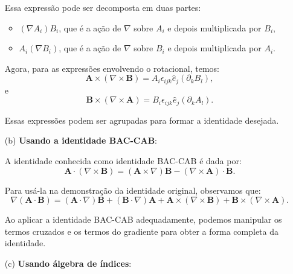 \documentclass[a4paper,12pt]{article}
\begin{document}
\begin{flushleft}
\begin{itemize}
        Essa expressão pode ser decomposta em duas partes:
        \begin{itemize}
            \item \( (\nabla A_i) B_i \), que é a ação de \( \nabla \) sobre \( A_i \) e depois multiplicada por \( B_i \),
            \item \( A_i (\nabla B_i) \), que é a ação de \( \nabla \) sobre \( B_i \) e depois multiplicada por \( A_i \).
        \end{itemize}
        
        Agora, para as expressões envolvendo o rotacional, temos:
        \begin{equation}
        \mathbf{A} \times (\nabla \times \mathbf{B}) = A_i \epsilon_{ijk} \hat{e}_j (\partial_k B_l),
        \end{equation}
        e
        \begin{equation}
        \mathbf{B} \times (\nabla \times \mathbf{A}) = B_i \epsilon_{ijk} \hat{e}_j (\partial_k A_l).
        \end{equation}
        
        Essas expressões podem ser agrupadas para formar a identidade desejada.
        
        \item[(b)] \textbf{Usando a identidade BAC-CAB}:
        
        A identidade conhecida como identidade BAC-CAB é dada por:
        \begin{equation}
        \mathbf{A} \cdot (\nabla \times \mathbf{B}) = (\mathbf{A} \times \nabla) \mathbf{B} - (\nabla \times \mathbf{A}) \cdot \mathbf{B}.
        \end{equation}
        
        Para usá-la na demonstração da identidade original, observamos que:
        \begin{equation}
        \nabla (\mathbf{A} \cdot \mathbf{B}) = (\mathbf{A} \cdot \nabla) \mathbf{B} + (\mathbf{B} \cdot \nabla) \mathbf{A} + \mathbf{A} \times (\nabla \times \mathbf{B}) + \mathbf{B} \times (\nabla \times \mathbf{A}).
        \end{equation}
        
        Ao aplicar a identidade BAC-CAB adequadamente, podemos manipular os termos cruzados e os termos do gradiente para obter a forma completa da identidade.
        
        \item[(c)] \textbf{Usando álgebra de índices}:
        

\end{itemize}
\end{flushleft}
\end{document}
